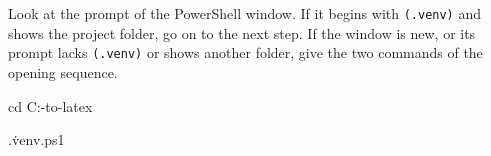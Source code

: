 Look at the prompt of the PowerShell window. If it begins with \texttt{(.venv)} and shows the
project folder, go on to the next step. If the window is new, or its prompt lacks
\texttt{(.venv)} or shows another folder, give the two commands of the opening sequence.
\begin{ps}
cd C:\camera-to-latex
\end{ps}
\begin{ps}
.\.venv\Scripts\Activate.ps1
\end{ps}
\venvprompt
